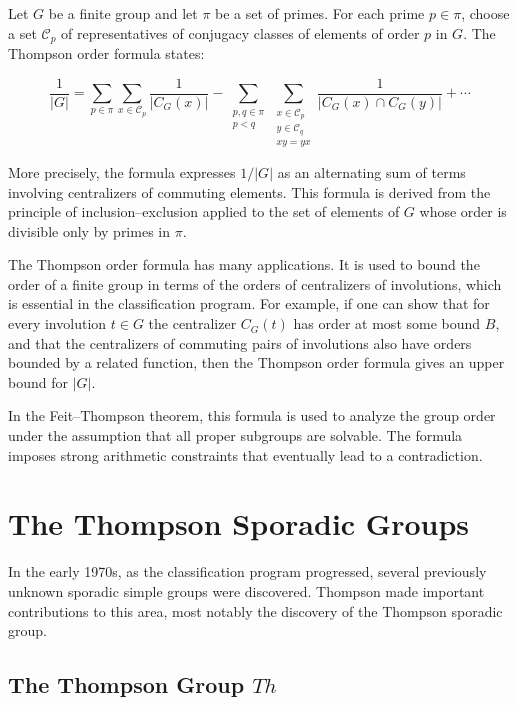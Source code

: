 Let \(G\) be a finite group and let \(\pi\) be a set of primes. For each prime \(p \in \pi\), choose a set \(\mathcal{C}_p\) of representatives of conjugacy classes of elements of order \(p\) in \(G\). The Thompson order formula states:

\[
\frac{1}{|G|} = \sum_{p \in \pi} \sum_{x \in \mathcal{C}_p} \frac{1}{|C_G(x)|} - \sum_{\substack{p,q \in \pi \\ p < q}} \sum_{\substack{x \in \mathcal{C}_p \\ y \in \mathcal{C}_q \\ xy = yx}} \frac{1}{|C_G(x) \cap C_G(y)|} + \cdots
\]

More precisely, the formula expresses \(1/|G|\) as an alternating sum of terms involving centralizers of commuting elements. This formula is derived from the principle of inclusion--exclusion applied to the set of elements of \(G\) whose order is divisible only by primes in \(\pi\).

The Thompson order formula has many applications. It is used to bound the order of a finite group in terms of the orders of centralizers of involutions, which is essential in the classification program. For example, if one can show that for every involution \(t \in G\) the centralizer \(C_G(t)\) has order at most some bound \(B\), and that the centralizers of commuting pairs of involutions also have orders bounded by a related function, then the Thompson order formula gives an upper bound for \(|G|\).

In the Feit--Thompson theorem, this formula is used to analyze the group order under the assumption that all proper subgroups are solvable. The formula imposes strong arithmetic constraints that eventually lead to a contradiction.

\section{The Thompson Sporadic Groups}

In the early 1970s, as the classification program progressed, several previously unknown sporadic simple groups were discovered. Thompson made important contributions to this area, most notably the discovery of the Thompson sporadic group.

\subsection{The Thompson Group \texorpdfstring{\(Th\)}{Th}}

